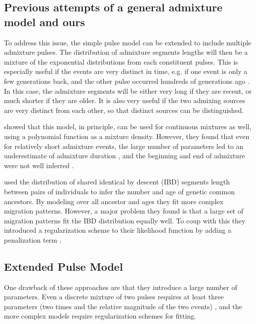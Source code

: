 \documentclass[]{article}
\begin{document}
\subsection{Previous attempts of a general admixture model and ours}\label{Previous attempts of a general admixture model and ours}

To address this issue, the simple pulse model can be extended to include  multiple admixture pulses. The distribution of admixture segments lengths will then be a mixture of the exponential distributions from each constituent pulses. This is especially useful if the events are very distinct in time, e.g. if one event is only a few generations back, and the other pulse occurred hundreds of generations ago \citep{fu_genome_2014,slon_genome_2018}. In this case, the admixture segments will be either very long if they are recent, or much shorter if they are older. It is also very useful if the two admixing sources are very distinct from each other, so that distinct sources can be distinguished. 

\cite{zhou_modeling_2017} showed that this model, in principle, can be used for continuous mixtures as well, using a polynomial function as a mixture density. However, they found that even for relatively short admixture events, the large number of parameters led to an underestimate of admixture duration \citep{zhou_inference_2017}, and the beginning and end of admixture were not well inferred
\citep{zhou_modeling_2017,zhou_inference_2017}. 

\cite{ralph_geography_2013} used the distribution of shared identical by descent (IBD)  segments length between pairs of individuals to infer the number and age of genetic common ancestors. By modeling over all ancestor and ages they fit more complex migration patterns. However, a major problem they found is that a large set of migration patterns fit the IBD distribution equally well. To coup with this they introduced a regularization scheme to their likelihood function by adding a penalization term \citep{ralph_geography_2013}.

\subsection{Extended Pulse Model}

One drawback of  these approaches are that they introduce a large number of parameters. Even a discrete mixture of two pulses requires at least three parameters (two times and the relative magnitude of the two events) \citep{pickrell_ancient_2014}, and the more complex models require regularization schemes for fitting.
\end{document}
